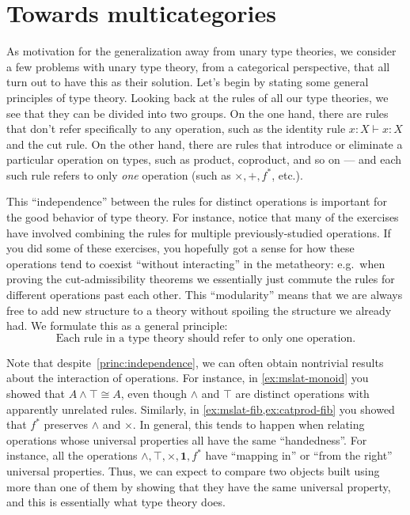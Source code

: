 \documentclass{book}
\let\types\vdash
\let\meet\wedge
\def\unit{\mathbf{1}}
\begin{document}
\section{Towards multicategories}
\label{sec:why-multicats}

As motivation for the generalization away from unary type theories, we consider a few problems with unary type theory, from a categorical perspective, that all turn out to have this as their solution.
Let's begin by stating some general principles of type theory.
Looking back at the rules of all our type theories, we see that they can be divided into two groups.
On the one hand, there are rules that don't refer specifically to any operation, such as the identity rule $x:X \types x:X$ and the cut rule.
On the other hand, there are rules that introduce or eliminate a particular operation on types, such as product, coproduct, and so on --- and each such rule refers to only \emph{one} operation  (such as $\times,+,f^*$, etc.).

This ``independence'' between the rules for distinct operations is important for the good behavior of type theory.
For instance, notice that many of the exercises have involved combining the rules for multiple previously-studied operations.
If you did some of these exercises, you hopefully got a sense for how these operations tend to coexist ``without interacting'' in the metatheory: e.g.\
when proving the cut-admissibility theorems we essentially just commute the rules for different operations past each other.
This ``modularity'' means that we are always free to add new structure to a theory without spoiling the structure we already had.
We formulate this as a general principle:
\begin{equation}\label{princ:independence}
  \text{Each rule in a type theory should refer to only one operation}.\tag{$\ast$}
\end{equation}

Note that despite~\eqref{princ:independence}, we can often obtain nontrivial results about the interaction of operations.
For instance, in \cref{ex:mslat-monoid} you showed that $A\meet \top\cong A$, even though $\meet$ and $\top$ are distinct operations with apparently unrelated rules.
Similarly, in \cref{ex:mslat-fib,ex:catprod-fib} you showed that $f^*$ preserves $\meet$ and $\times$.
In general, this tends to happen when relating operations whose universal properties all have the same ``handedness''.
For instance, all the operations $\meet,\top,\times,\unit,f^*$ have ``mapping in'' or ``from the right'' universal properties.
Thus, we can expect to compare two objects built using more than one of them by showing that they have the same universal property, and this is essentially what type theory does.
\end{document}
